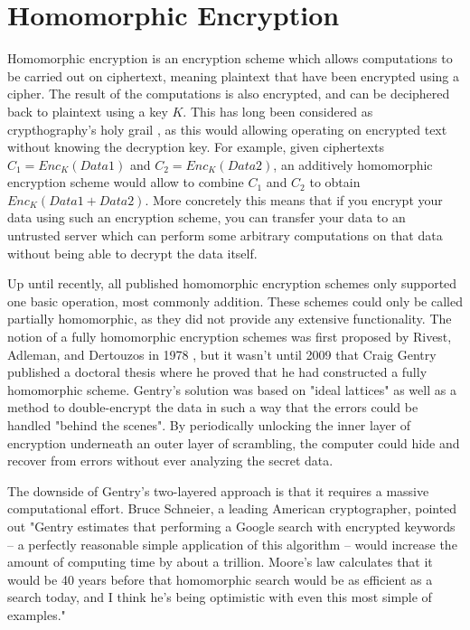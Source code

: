 

\section{Homomorphic Encryption}
Homomorphic encryption is an encryption scheme which allows computations to be carried out on ciphertext, meaning plaintext that have been encrypted using a cipher. The result of the computations is also encrypted, and can be deciphered back to plaintext using a key $K$. This has long been considered as crypthography's holy grail \cite{Micciancio2011HomoEnc}, as this would allowing operating on encrypted text without knowing the decryption key. For example, given ciphertexts $C_1=Enc_K(Data1)$ and $C_2=Enc_K(Data2)$, an additively homomorphic encryption scheme would allow to combine $C_1$ and $C_2$ to obtain $Enc_K(Data1+Data2)$. More concretely this means that if you encrypt your data using such an encryption scheme, you can transfer your data to an untrusted server which can perform some arbitrary computations on that data without being able to decrypt the data itself.

Up until recently, all published homomorphic encryption schemes only supported one basic operation, most commonly addition. These schemes could only be called partially homomorphic, as they did not provide any extensive functionality. The notion of a  fully homomorphic encryption schemes was first proposed by Rivest, Adleman, and Dertouzos in 1978 \cite{rivest1978data}, but it wasn't until 2009 that Craig Gentry published a doctoral thesis where he proved that he had constructed a fully homomorphic scheme\cite{gentry2009FHEpaper}. Gentry's solution was based on "ideal lattices" as well as a method to double-encrypt the data in such a way that the errors could be handled "behind the scenes". By periodically unlocking the inner layer of encryption underneath an outer layer of scrambling, the computer could hide and recover from errors without ever analyzing the secret data. 

The downside of Gentry's two-layered approach is that it requires a massive computational effort. Bruce Schneier, a leading American cryptographer, pointed out "Gentry estimates that performing a Google search with encrypted keywords -- a perfectly reasonable simple application of this algorithm -- would increase the amount of computing time by about a trillion. Moore's law calculates that it would be 40 years before that homomorphic search would be as efficient as a search today, and I think he's being optimistic with even this most simple of examples\cite{schneier2009blog}." 






\cleardoublepage
